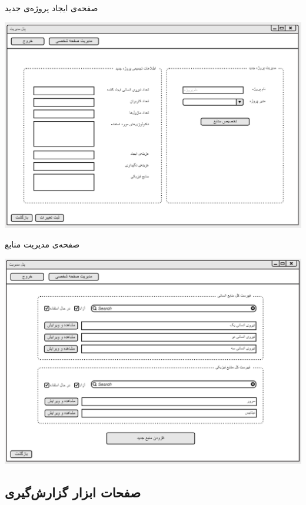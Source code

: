 \documentclass{article}
\begin{document}
\vspace{1cm}
صفحه‌ی ایجاد پروژه‌ی جدید
\begin{center}
\includegraphics[width=\textwidth]{Prototype/HeadManager/CreateNewProject.png}
\end{center}

\newpage
\vspace{1cm}
صفحه‌ی مدیریت منابع 
\begin{center}
\includegraphics[width=\textwidth]{Prototype/HeadManager/ManageAllResources.png}
\end{center}

\newpage
\subsection{صفحات ابزار گزارش‌گیری}
\end{document}
